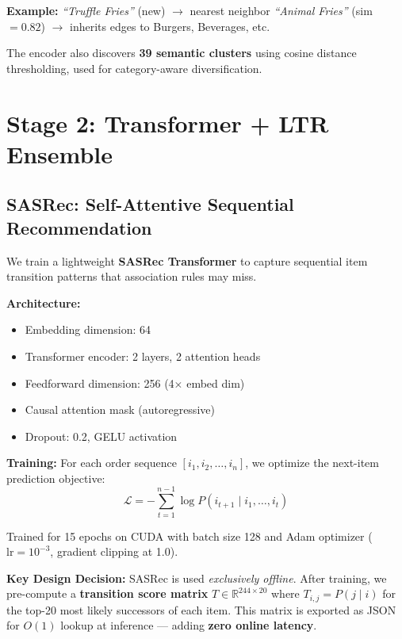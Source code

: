 \documentclass[10pt, twocolumn, a4paper]{article}
\begin{document}
\textbf{Example:} \textit{``Truffle Fries''} (new) $\to$ nearest neighbor \textit{``Animal Fries''} (sim $= 0.82$) $\to$ inherits edges to Burgers, Beverages, etc.

The encoder also discovers \textbf{39 semantic clusters} using cosine distance thresholding, used for category-aware diversification.

\section{Stage 2: Transformer + LTR Ensemble}

\subsection{SASRec: Self-Attentive Sequential Recommendation}

We train a lightweight \textbf{SASRec Transformer} \cite{sasrec} to capture sequential item transition patterns that association rules may miss.

\textbf{Architecture:}
\begin{itemize}
    \item Embedding dimension: 64
    \item Transformer encoder: 2 layers, 2 attention heads
    \item Feedforward dimension: 256 (4$\times$ embed dim)
    \item Causal attention mask (autoregressive)
    \item Dropout: 0.2, GELU activation
\end{itemize}

\textbf{Training:} For each order sequence $[i_1, i_2, \ldots, i_n]$, we optimize the next-item prediction objective:
\begin{equation}
\mathcal{L} = -\sum_{t=1}^{n-1} \log P(i_{t+1} \mid i_1, \ldots, i_t)
\label{eq:sasrec}
\end{equation}

Trained for 15 epochs on CUDA with batch size 128 and Adam optimizer ($\text{lr} = 10^{-3}$, gradient clipping at 1.0).

\textbf{Key Design Decision:} SASRec is used \textit{exclusively offline}. After training, we pre-compute a \textbf{transition score matrix} $T \in \mathbb{R}^{244 \times 20}$ where $T_{i,j} = P(j \mid i)$ for the top-20 most likely successors of each item. This matrix is exported as JSON for $O(1)$ lookup at inference --- adding \textbf{zero online latency}.
\end{document}
